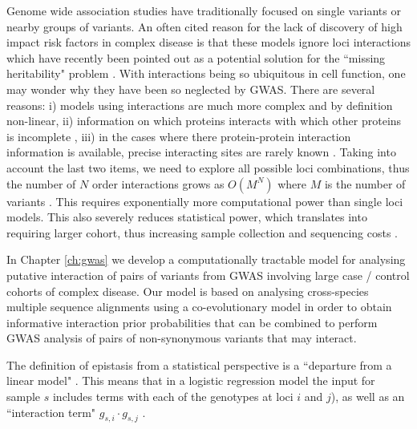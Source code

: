 Genome wide association studies have traditionally focused on single variants or nearby groups of variants. An often cited reason for the lack of discovery of high impact risk factors in complex disease is that these models ignore loci interactions \cite{cordell2009detecting} which have recently been pointed out as a potential solution for the ``missing heritability" problem \cite{zuk2012mystery, zuk2014searching}. With interactions being so ubiquitous in cell function, one may wonder why they have been so neglected by GWAS. There are several reasons: i) models using interactions are much more complex \cite{gao2010classification} and by definition non-linear, ii) information on which proteins interacts with which other proteins is incomplete \cite{venkatesan2009empirical}, iii) in the cases where there protein-protein interaction information is available, precise interacting sites are rarely known \cite{venkatesan2009empirical}. Taking into account the last two items, we need to explore all possible loci combinations, thus the number of $N$ order interactions grows as $O(M^N)$ where $M$ is the number of variants \cite{de2013emerging}. This requires exponentially more computational power than single loci models. This also severely reduces statistical power, which translates into requiring larger cohort, thus increasing sample collection and sequencing costs \cite{de2013emerging}.

In Chapter \ref{ch:gwas} we develop a computationally tractable model for analysing putative interaction of pairs of variants from GWAS involving large case / control cohorts of complex disease. Our model is based on analysing cross-species multiple sequence alignments using a co-evolutionary model in order to obtain informative interaction prior probabilities that can be combined to perform GWAS analysis of pairs of non-synonymous variants that may interact.


The definition of epistasis from a statistical perspective is a ``departure from a linear model" \cite{cordell2009detecting}. This means that in a logistic regression model the input for sample $s$ includes terms with each of the genotypes at loci $i$ and $j$), as well as an ``interaction term" $g_{s,i} \cdot g_{s,j}$ \cite{cordell2002epistasis}. 

